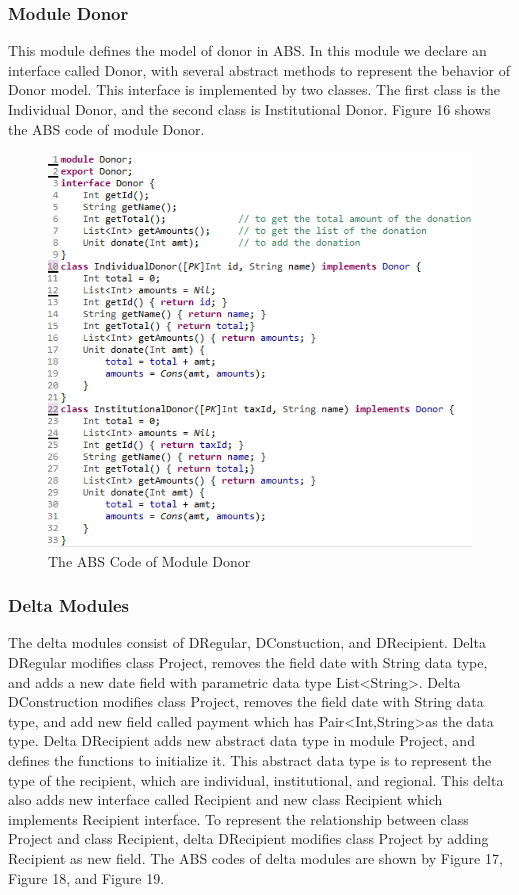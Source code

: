 \documentclass[runningheads,a4paper]{llncs}
\begin{document}
\subsubsection{Module Donor}
This module defines the model of donor in ABS. In this module we declare an interface called Donor, with several abstract methods to represent the behavior of Donor model. This interface is implemented by two classes. The first class is the Individual Donor, and the second class is Institutional Donor. Figure 16 shows the ABS code of module Donor.

\begin{figure}
	\centering
	\includegraphics[scale=0.7]{code2.png}
	\caption{The ABS Code of Module Donor}
	\label{Figure 16}
\end{figure}

\subsubsection{Delta Modules}
The delta modules consist of DRegular, DConstuction, and DRecipient. Delta DRegular modifies class Project, removes the field date with String data type, and adds a new date field with parametric data type List\textless String\textgreater. Delta DConstruction modifies class Project, removes the field date with String data type, and add new field called payment which has Pair\textless Int,String\textgreater as the data type. Delta DRecipient adds new abstract data type in module Project, and defines the functions to initialize it. This abstract data type is to represent the type of the recipient, which are individual, institutional, and regional. This delta also adds new interface called Recipient and new class Recipient which implements Recipient interface. To represent the relationship between class Project and class Recipient, delta DRecipient modifies class Project by adding Recipient as new field. The ABS codes of delta modules are shown by Figure 17, Figure 18, and Figure 19.
\end{document}
